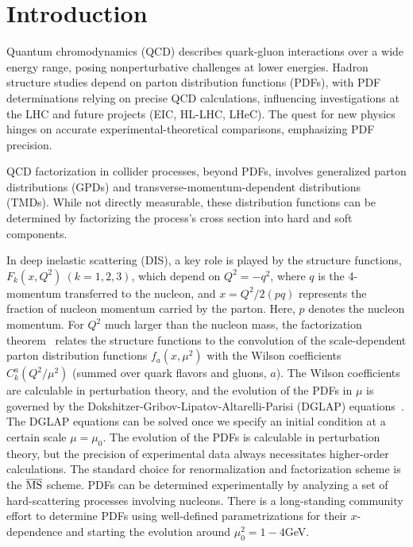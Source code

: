 \section{Introduction}
Quantum chromodynamics (QCD) describes quark-gluon interactions over
a wide energy range, posing nonperturbative challenges at lower energies.
Hadron structure studies depend on parton distribution functions (PDFs),
with PDF determinations relying on precise QCD calculations,
influencing investigations at the LHC and future projects (EIC, HL-LHC, LHeC).
The quest for new physics hinges on accurate experimental-theoretical comparisons,
emphasizing PDF precision.

QCD factorization in collider processes, beyond PDFs,
involves generalized parton distributions (GPDs) and
transverse-momentum-dependent distributions (TMDs).
While not directly measurable, these distribution functions
can be determined by factorizing the process's cross section
into hard and soft components.

In deep inelastic scattering (DIS), a key role is played by the structure
functions, $F_k(x,Q^2)~(k=1,2,3)$, which depend on $Q^2=-q^2$, where $q$ is the 4-momentum
transferred to the nucleon, and $x = Q^2/2(pq)$ represents
the fraction of nucleon momentum carried by the parton.
Here, $p$ denotes the nucleon momentum.
For $Q^2$ much larger than the nucleon mass,
the factorization theorem~\cite{Collins:1989gx}
relates the structure functions to the convolution of
the scale-dependent parton distribution functions $f_a(x,\mu^2)$
with the Wilson coefficients $C_k^a(Q^2/\mu^2)$
(summed over quark flavors and gluons, $a$).
The Wilson coefficients are calculable in perturbation theory, and the
evolution of the PDFs in $\mu$ is governed by the
Dokshitzer-Gribov-Lipatov-Altarelli-Parisi (DGLAP)
equations~\cite{Gribov:1972ri,Lipatov:1974qm,Dokshitzer:1977sg,Altarelli:1977zs}.
The DGLAP equations can be solved once we specify an initial condition at
a certain scale $\mu=\mu_0$. The evolution of the PDFs is calculable
in perturbation theory, but the precision of experimental data
always necessitates higher-order calculations.
The standard choice for renormalization
and factorization scheme is the $\overline {\text{MS}}$ scheme.
PDFs can be determined experimentally by analyzing a set of
hard-scattering processes involving nucleons.
There is a long-standing community effort to determine
PDFs using well-defined parametrizations for their $x$-dependence
and starting the evolution around $\mu_0^2 = 1 - 4$GeV.

